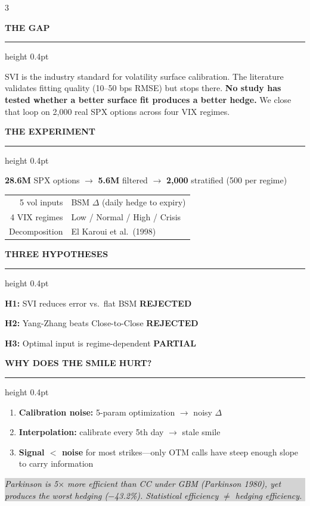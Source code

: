 \documentclass[9pt, letterpaper, landscape]{article}
\newcommand{\hsec}[1]{%
  \vspace{4pt}%
  {\footnotesize\bfseries\color{Navy}\MakeUppercase{#1}}%
  \par\vspace{1pt}%
  {\color{Teal}\hrule height 0.4pt}%
  \vspace{2pt}%
}
\begin{document}
\begin{multicols}{3}


\hsec{The Gap}

{\scriptsize
SVI is the industry standard for volatility surface calibration. The literature validates fitting quality (10--50 bps RMSE) but stops there. \textbf{No study has tested whether a better surface fit produces a better hedge.} We close that loop on 2,000 real SPX options across four VIX regimes.}

\hsec{The Experiment}

{\scriptsize
\textbf{28.6M} SPX options $\to$ \textbf{5.6M} filtered $\to$ \textbf{2,000} stratified (500 per regime)

\vspace{2pt}
\begin{tabular}{@{}r@{\;$\to$\;}l@{}}
5 vol inputs & BSM $\Delta$ (daily hedge to expiry)\\
4 VIX regimes & Low / Normal / High / Crisis\\
Decomposition & El Karoui et al.\ (1998)\\
\end{tabular}
}

\hsec{Three Hypotheses}

{\scriptsize
\textbf{H1:} SVI reduces error vs.\ flat BSM \hfill \textcolor{NegRed}{\textbf{REJECTED}}

\textbf{H2:} Yang-Zhang beats Close-to-Close \hfill \textcolor{NegRed}{\textbf{REJECTED}}

\textbf{H3:} Optimal input is regime-dependent \hfill \textcolor{PosGreen}{\textbf{PARTIAL}}
}

\hsec{Why Does the Smile Hurt?}

{\scriptsize
\begin{enumerate}[nosep, leftmargin=12pt, itemsep=1pt]
\item \textbf{Calibration noise:} 5-param optimization $\to$ noisy $\Delta$
\item \textbf{Interpolation:} calibrate every 5th day $\to$ stale smile
\item \textbf{Signal $<$ noise} for most strikes---only OTM calls have steep enough slope to carry information
\end{enumerate}

\vspace{2pt}
\colorbox{LightGray}{\parbox{0.95\linewidth}{\scriptsize\textit{Parkinson is 5$\times$ more efficient than CC under GBM (Parkinson 1980), yet produces the worst hedging ($-$43.2\%). Statistical efficiency $\neq$ hedging efficiency.}}}}


\end{multicols}
\end{document}
